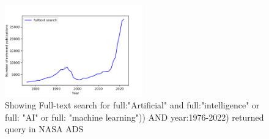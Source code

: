 \documentclass[final,5p,times,twocolumn,authoryear]{elsarticle}
\begin{document}
 \begin{figure}
    \centering
    \includegraphics[width=0.53\textwidth]{figs/fulltextai.png}
    \vspace*{-0.3cm}
    \caption{Showing Full-text search for  full:"Artificial" and full:"intelligence" or full: "AI" or full: "machine learning")) AND year:1976-2022) returned query in NASA ADS}
    \label{fig:ai}
\end{figure}
\end{document}
